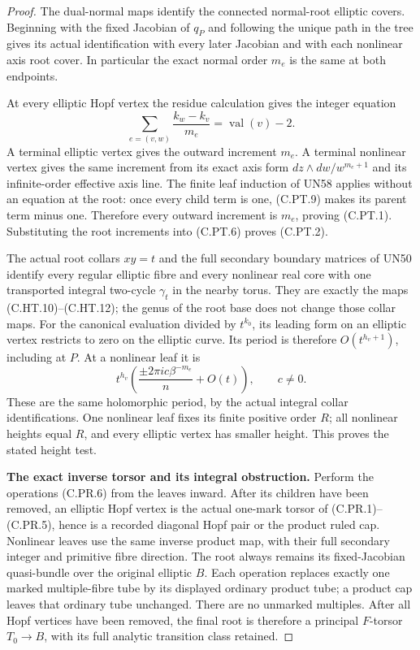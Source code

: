 \begin{proof}
The dual-normal maps identify the connected
normal-root elliptic covers. Beginning with
the fixed Jacobian of $q_P$ and following the
unique path in the tree gives its actual
identification with every later Jacobian and
with each nonlinear axis root cover. In
particular the exact normal order $m_e$ is
the same at both endpoints.

At every elliptic Hopf vertex the residue
calculation gives the integer equation
\[
 \sum_{e=(v,w)}
       \frac{k_w-k_v}{m_e}
                        =\operatorname{val}(v)-2.
 \tag{C.PT.9}
\]
A terminal elliptic vertex gives the outward
increment $m_e$. A terminal nonlinear vertex
gives the same increment from its exact
axis form $dz\wedge dw/w^{m_e+1}$ and its
infinite-order effective axis line.
The finite leaf induction of UN58 applies
without an equation at the root: once every
child term is one, (C.PT.9) makes its parent
term minus one. Therefore every outward
increment is $m_e$, proving (C.PT.1).
Substituting the root increments into
(C.PT.6) proves (C.PT.2).

The actual root collars $xy=t$ and the full
secondary boundary matrices of UN50 identify
every regular elliptic fibre and every
nonlinear real core with one transported
integral two-cycle $\gamma_t$ in the nearby
torus. They are exactly the maps
(C.HT.10)--(C.HT.12); the genus of the root
base does not change those collar maps.
For the canonical evaluation divided by
$t^{k_0}$, its leading form on an elliptic
vertex restricts to zero on the elliptic
curve. Its period is therefore
$O(t^{h_v+1})$, including at $P$.
At a nonlinear leaf it is
\[
 t^{h_v}
       \left(\frac{\pm2\pi i c\beta^{-m_e}}{n}
                         +O(t)\right),\qquad c\ne0.
 \tag{C.PT.10}
\]
These are the same holomorphic period, by the
actual integral collar identifications.
One nonlinear leaf fixes its finite positive
order $R$; all nonlinear heights equal $R$,
and every elliptic vertex has smaller height.
This proves the stated height test.

\par\medskip\noindent\textbf{The exact inverse torsor and its integral obstruction.}
Perform the operations (C.PR.6) from the leaves
inward. After its children have been removed,
an elliptic Hopf vertex is the actual one-mark
torsor of (C.PR.1)--(C.PR.5), hence is a
recorded diagonal Hopf pair or the product
ruled cap. Nonlinear leaves use the same
inverse product map, with their full
secondary integer and primitive fibre
direction. The root always remains its
fixed-Jacobian quasi-bundle over the original
elliptic $B$. Each operation replaces exactly
one marked multiple-fibre tube by its
displayed ordinary product tube; a product
cap leaves that ordinary tube unchanged.
There are no unmarked multiples. After all
Hopf vertices have been removed, the final
root is therefore a principal $F$-torsor
$T_0\to B$, with its full analytic transition
class retained.


\end{proof}
